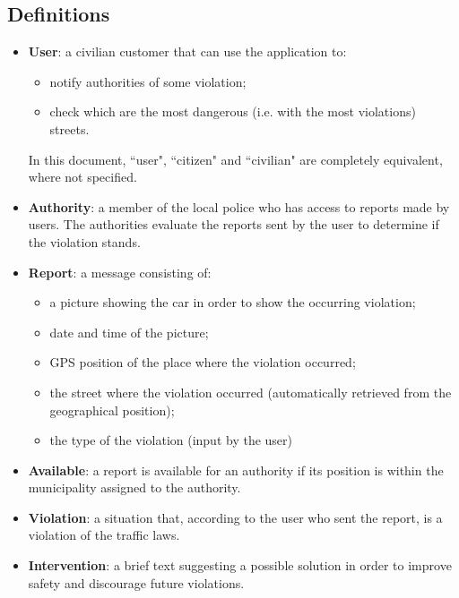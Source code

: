 \documentclass[12pt,a4paper]{report}
\begin{document}
			\subsection{Definitions}
				\begin{itemize}
				\item \textbf{User}: a civilian customer that can use the application to:
					\begin{itemize}
					\item notify authorities of some violation;
					\item check which are the most dangerous (i.e. with the most violations) streets.
					\end{itemize}
				In this document, ``user", ``citizen" and ``civilian" are completely equivalent, where not specified.
				\item \textbf{Authority}: a member of the local police who has access to reports made by users. The
					authorities evaluate the reports sent by the user to determine if the violation stands.
				\item \textbf{Report}: a message consisting of:
					\begin{itemize}
					\item a picture showing the car in order to show the occurring violation;
					\item date and time of the picture;
					\item GPS position of the place where the violation occurred;
					\item the street where the violation occurred (automatically retrieved from the geographical position);
					\item the type of the violation (input by the user)
					\end{itemize}
				\item \textbf{Available}: a report is available for an authority if its position is within the municipality assigned
					to the authority.
				\item \textbf{Violation}: a situation that, according to the user who sent the report, is a violation of the
					traffic laws.
				\item \textbf{Intervention}: a brief text suggesting a possible solution in order to improve safety and
					discourage future violations.
				\end{itemize}
\end{document}
